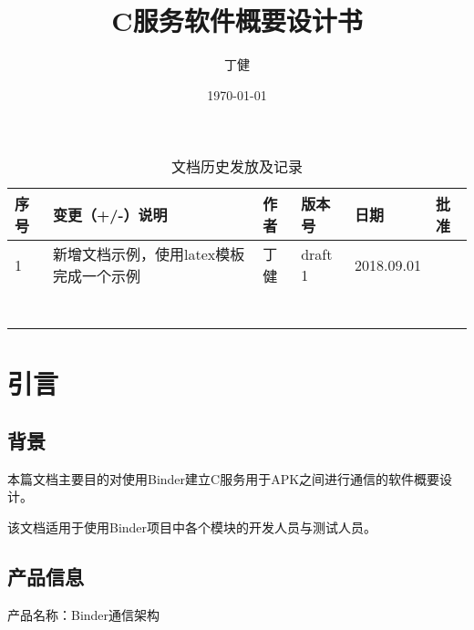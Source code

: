 \documentclass[10pt,a4paper,titlepage]{article} %
\title{C服务软件概要设计书}
\author{丁健}
\date{ \today }
\begin{document}
\maketitle
\clearpage
\pagestyle{empty}
\pagestyle{fancy}   %
\rhead{\today}
\cfoot{}
\setcounter{page}{1}
\renewcommand{\thetable}{}
\renewcommand{\captionfont}{\Large}
\begin{table}[h]
\Large   
\caption{文档历史发放及记录}  
\begin{center}  
\begin{tabular}{|m{1.5cm}<{\centering}|m{4.5cm}<{\centering}|m{2cm}<{\centering}|m{2cm}<{\centering}|m{2.2cm}<{\centering}|m{1.3cm}<{\centering}|}  
\hline  
序号 & 变更（+/-）说明 & 作者 & 版本号 & 日期 & 批准 \\ \hline  
1 & 新增文档示例，使用latex模板完成一个示例 & 丁健 & draft 1 & 2018.09.01 &  \\ \hline
  &  &  &  &  &  \\ \hline
  &  &  &  &  &  \\ \hline
  &  &  &  &  &  \\ \hline
  &  &  &  &  &  \\ \hline 
  &  &  &  &  &  \\ \hline
  &  &  &  &  &  \\ \hline
  &  &  &  &  &  \\ \hline 

\end{tabular}  
\end{center}  
\end{table} 
\clearpage
\tableofcontents  %
\clearpage
\setcounter{page}{1}
\section{引言}
\subsection{背景}
本篇文档主要目的对使用Binder建立C服务用于APK之间进行通信的软件概要设计。

该文档适用于使用Binder项目中各个模块的开发人员与测试人员。

\subsection{产品信息}
产品名称：Binder通信架构
\end{document}
